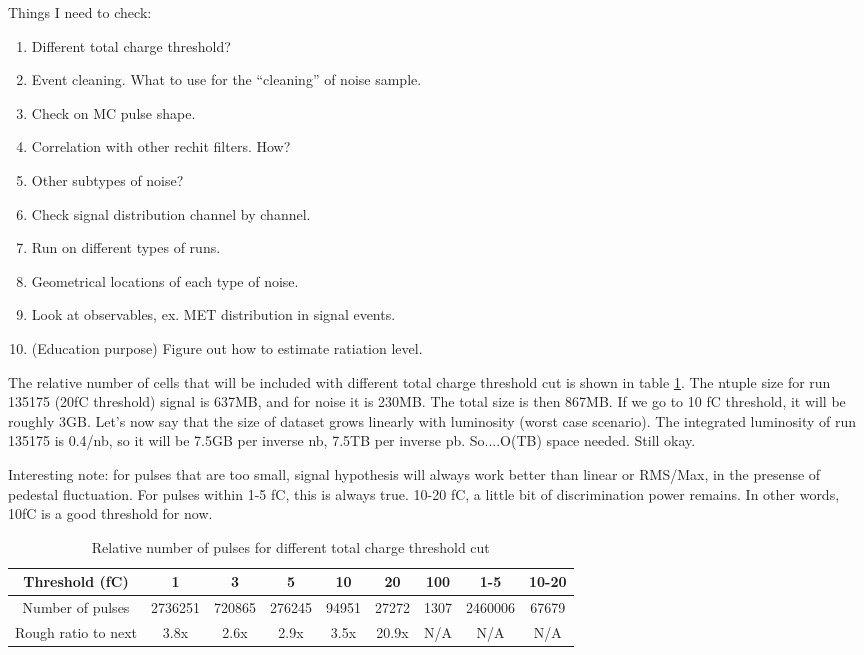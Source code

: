 Things I need to check:

\begin{enumerate}
\item Different total charge threshold?
\item Event cleaning.  What to use for the ``cleaning'' of noise sample.
\item Check on MC pulse shape.
\item Correlation with other rechit filters.  How?
\item Other subtypes of noise?
\item Check signal distribution channel by channel.
\item Run on different types of runs.
\item Geometrical locations of each type of noise.
\item Look at observables, ex. MET distribution in signal events.
\item (Education purpose)  Figure out how to estimate ratiation level.
\end{enumerate}


The relative number of cells that will be included with different total charge threshold cut is shown in table \ref{Table_6332RelativePulseCountTotalChargeThreshold}.
The ntuple size for run 135175 (20fC threshold) signal is 637MB, and for noise it is 230MB.  The total size is then 867MB.
If we go to 10 fC threshold, it will be roughly 3GB.  Let's now say that the size of dataset grows linearly with luminosity (worst case scenario).
The integrated luminosity of run 135175 is 0.4/nb, so it will be 7.5GB per inverse nb, 7.5TB per inverse pb.
So....O(TB) space needed.  Still okay.

Interesting note: for pulses that are too small, signal hypothesis will always work better than linear or RMS/Max, in the presense of pedestal fluctuation.
For pulses within 1-5 fC, this is always true.  10-20 fC, a little bit of discrimination power remains.  In other words, 10fC is a good threshold for now.

\begin{table}
   \centering
   \begin{tabular}{|c|c|c|c|c|c|c||c|c|}
      \hline
      Threshold (fC) & 1 & 3 & 5 & 10 & 20 & 100 & 1-5 & 10-20 \\\hline
      Number of pulses & 2736251 & 720865 & 276245 & 94951 & 27272 & 1307 & 2460006 & 67679 \\\hline
      Rough ratio to next & 3.8x & 2.6x & 2.9x & 3.5x & 20.9x & N/A & N/A & N/A \\\hline
   \end{tabular}
   \caption{Relative number of pulses for different total charge threshold cut}
   \label{Table_6332RelativePulseCountTotalChargeThreshold}
\end{table}

